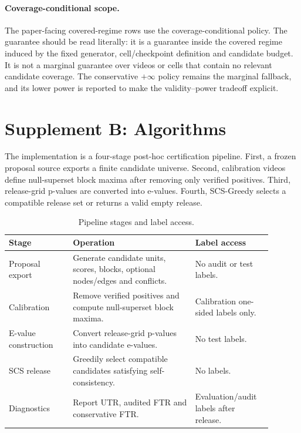 \documentclass[11pt]{article}
\begin{document}
\paragraph{Coverage-conditional scope.}
The paper-facing covered-regime rows use the coverage-conditional policy.
The guarantee should be read literally: it is a guarantee inside the covered regime induced by the fixed generator, cell/checkpoint definition and candidate budget.
It is not a marginal guarantee over videos or cells that contain no relevant candidate coverage.
The conservative \(+\infty\) policy remains the marginal fallback, and its lower power is reported to make the validity--power tradeoff explicit.

\clearpage

\section*{Supplement B: Algorithms}

The implementation is a four-stage post-hoc certification pipeline.
First, a frozen proposal source exports a finite candidate universe.
Second, calibration videos define null-superset block maxima after removing only verified positives.
Third, release-grid p-values are converted into e-values.
Fourth, SCS-Greedy selects a compatible release set or returns a valid empty release.

\begin{table}[h]
\centering
\caption{Pipeline stages and label access.}
\small
\begin{tabular}{p{0.22\linewidth}p{0.42\linewidth}p{0.25\linewidth}}
\toprule
Stage & Operation & Label access \\
\midrule
Proposal export & Generate candidate units, scores, blocks, optional nodes/edges and conflicts. & No audit or test labels. \\
Calibration & Remove verified positives and compute null-superset block maxima. & Calibration one-sided labels only. \\
E-value construction & Convert release-grid p-values into candidate e-values. & No test labels. \\
SCS release & Greedily select compatible candidates satisfying self-consistency. & No labels. \\
Diagnostics & Report UTR, audited FTR and conservative FTR. & Evaluation/audit labels after release. \\
\bottomrule
\end{tabular}
\end{table}
\end{document}
